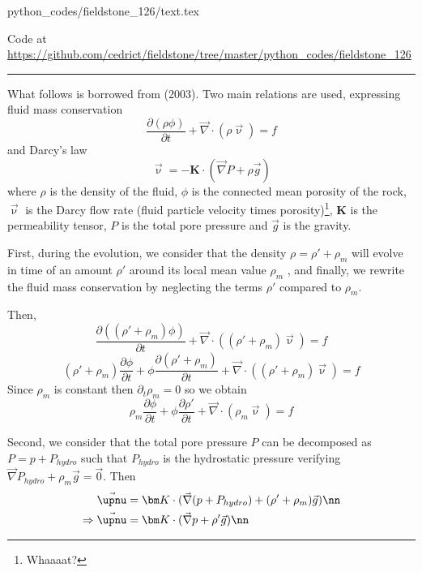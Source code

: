 \begin{flushright} {\tiny {\color{gray} python\_codes/fieldstone\_126/text.tex}} \end{flushright}

%

\begin{center}

Code at \url{https://github.com/cedrict/fieldstone/tree/master/python_codes/fieldstone_126}
\end{center}

\par\noindent\rule{\textwidth}{0.4pt}



What follows is borrowed from \textcite{grfr03} (2003).
Two main relations are used, expressing fluid mass conservation
\[
\frac{\partial (\rho \phi)}{\partial t} + \vec\nabla\cdot (\rho \vec{\upnu}) = f
\]
and Darcy's law
\[
\vec\upnu = - {\bm K} \cdot (\vec{\nabla} P + \rho \vec{g})
\]
where $\rho$ is the density of the fluid, $\phi$ is the
connected mean porosity of the rock, $\vec{\upnu}$ is the Darcy flow
rate (fluid particle velocity times porosity)\footnote{Whaaaat?}, ${\bm K}$ is the
permeability tensor, $P$ is the total pore pressure and $\vec{g}$ is
the gravity.

First, during the evolution, we consider that the density 
$\rho = \rho' + \rho_m$ will evolve in time of an amount $\rho'$ 
around its local mean value $\rho_m$ , and finally, we rewrite the fluid mass
conservation by neglecting the terms $\rho'$ compared to $\rho_m$.

Then,
\[
\frac{\partial ((\rho'+\rho_m) \phi)}{\partial t} + \vec\nabla\cdot ((\rho'+\rho_m) \vec{\upnu}) = f
\]
\[
(\rho'+\rho_m) \frac{\partial \phi}{\partial t} 
+\phi \frac{\partial (\rho'+\rho_m)}{\partial t} 
+ \vec\nabla\cdot ((\rho'+\rho_m) \vec{\upnu}) = f
\]
Since $\rho_m$ is constant then $\partial_t \rho_m =0$ so we obtain
\[
\rho_m \frac{\partial \phi}{\partial t} 
+\phi \frac{\partial \rho' }{\partial t} 
+ \vec\nabla\cdot (\rho_m \vec{\upnu}) = f
\]


Second, we consider that the total pore pressure $P$ can
be decomposed as $P = p + P_{hydro}$ such that $P_{hydro}$ is the
hydrostatic pressure verifying $\vec\nabla P_{hydro} + \rho_m \vec{g} = \vec{0}$. 
Then 
\begin{align}
\vec\upnu &= {\bm K} \cdot (\vec{\nabla} (p + P_{hydro}) + (\rho'+\rho_m) \vec{g}) \nn\\
\Rightarrow \vec\upnu &= {\bm K} \cdot (\vec{\nabla} p + \rho' \vec{g}) \nn
\end{align}



